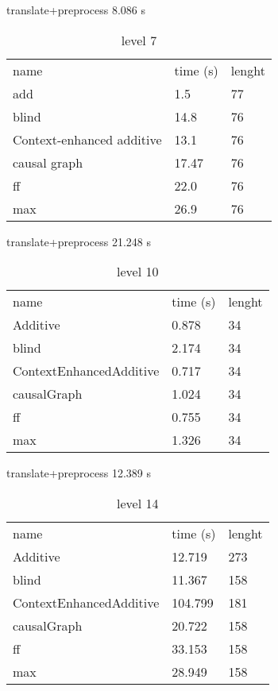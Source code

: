 	\begin{table}[h]
		\centering
		\caption{level 7}
		\label{tablvl7}
		translate+preprocess
		8.086 s\\
		\begin{tabular}{lll}
			
			name & time (s)& lenght\\
			add & 1.5 & 77\\
			blind & 14.8 & 76\\
			Context-enhanced additive & 13.1 & 76\\
			causal graph & 17.47 & 76\\
			ff & 22.0 & 76\\
			max & 26.9 & 76\\
		\end{tabular}
	\end{table}
	
	\begin{table}[h]
		\centering
		\caption{level 10}
		\label{tablvl10}
		translate+preprocess
		21.248 s\\
		\begin{tabular}{lll}
			
			
			name & time (s)& lenght\\
			Additive & 0.878 & 34\\
			blind & 2.174 & 34\\
			ContextEnhancedAdditive & 0.717 & 34\\
			causalGraph & 1.024 & 34\\
			ff & 0.755 & 34\\
			max & 1.326 & 34\\
		\end{tabular}
	\end{table}
	\begin{table}[h]
		\centering
		\caption{level 14}
		\label{tablvl14}
		translate+preprocess
		12.389 s\\
		\begin{tabular}{lll}
			
			
			name & time (s)& lenght\\
			Additive & 12.719 & 273\\
			blind & 11.367 & 158\\
			ContextEnhancedAdditive & 104.799 & 181\\
			causalGraph & 20.722 & 158\\
			ff & 33.153 & 158\\
			max & 28.949 & 158\\
		\end{tabular}
	\end{table}
	
